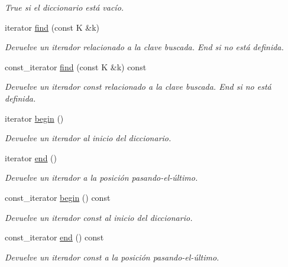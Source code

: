 \begin{DoxyCompactItemize}
\begin{DoxyCompactList}\small\item\em True si el diccionario está vacío. \end{DoxyCompactList}\item 
iterator \mbox{\hyperlink{classlinear__map_a227924393723570ac58f79fd194aac61}{find}} (const K \&k)
\begin{DoxyCompactList}\small\item\em Devuelve un iterador relacionado a la clave buscada. End si no está definida. \end{DoxyCompactList}\item 
const\+\_\+iterator \mbox{\hyperlink{classlinear__map_a99493e350f97f5c3932840a28406fd37}{find}} (const K \&k) const
\begin{DoxyCompactList}\small\item\em Devuelve un iterador const relacionado a la clave buscada. End si no está definida. \end{DoxyCompactList}\item 
iterator \mbox{\hyperlink{classlinear__map_a88a219ae647727d1b7e67c2dbe36d972}{begin}} ()
\begin{DoxyCompactList}\small\item\em Devuelve un iterador al inicio del diccionario. \end{DoxyCompactList}\item 
iterator \mbox{\hyperlink{classlinear__map_a29f90bee46581029b6ce496d4ea46683}{end}} ()
\begin{DoxyCompactList}\small\item\em Devuelve un iterador a la posición pasando-\/el-\/último. \end{DoxyCompactList}\item 
const\+\_\+iterator \mbox{\hyperlink{classlinear__map_a6f3bef755dbfb788cfe653a3ba70c211}{begin}} () const
\begin{DoxyCompactList}\small\item\em Devuelve un iterador const al inicio del diccionario. \end{DoxyCompactList}\item 
const\+\_\+iterator \mbox{\hyperlink{classlinear__map_a20a63149ca91f200c2ff3ea25bd0ad97}{end}} () const
\begin{DoxyCompactList}\small\item\em Devuelve un iterador const a la posición pasando-\/el-\/último. \end{DoxyCompactList}\item 

\end{DoxyCompactItemize}
